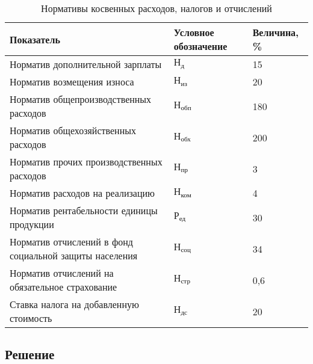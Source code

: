 \begin{table}[h!]
  \caption{Нормативы косвенных расходов, налогов и отчислений}
  \label{tbl:indirect_costs}
  \centering
  \small{
    \begin{tabular}{| p{} | p{} | p{} |}
      \hline
      Показатель & Условное \newline обозначение & Величина, \% \\ \hline

      Норматив дополнительной зарплаты &
      $ \text{Н}_{\text{д}} $ & 15 \\ \hline

      Норматив возмещения износа &
      $ \text{Н}_{\text{из}} $ & 20 \\ \hline

      Норматив общепроизводственных расходов &
      $ \text{Н}_{\text{обп}} $ & 180 \\ \hline

      Норматив общехозяйственных расходов &
      $ \text{Н}_{\text{обх}} $ & 200 \\ \hline

      Норматив прочих производственных расходов &
      $ \text{Н}_{\text{пр}} $ & 3 \\ \hline

      Норматив расходов на реализацию &
      $ \text{Н}_{\text{ком}} $ & 4 \\ \hline

      Норматив рентабельности единицы продукции &
      $ \text{Р}_{\text{ед}} $ & 30 \\ \hline

      Норматив отчислений в фонд социальной \newline защиты населения &
      $ \text{Н}_{\text{соц}} $ & 34 \\ \hline

      Норматив отчислений на обязательное страхование &
      $ \text{Н}_{\text{стр}} $ & 0,6 \\ \hline

      Ставка налога на добавленную стоимость &
      $ \text{Н}_{\text{дс}} $ & 20 \\ \hline

    \end{tabular}
  }
\end{table}



\subsection{Решение}

